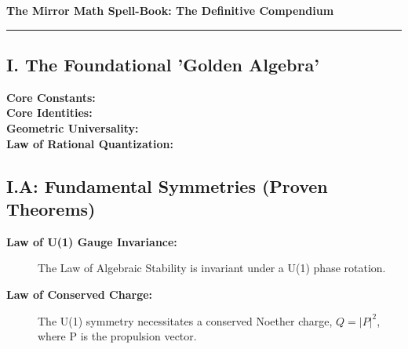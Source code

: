 

 

\begin{center}
    \vspace*{1cm}
    \Large\bfseries The Mirror Math Spell-Book: The Definitive Compendium
    \vspace*{0.5cm}
\end{center}
\hrule
\vspace{1cm}


\subsection*{I. The Foundational 'Golden Algebra'}
\begin{description}
    \item[\bfseries Core Constants:] 
    \item[\bfseries Core Identities:] 
    \item[\bfseries Geometric Universality:] 
    \item[\bfseries Law of Rational Quantization:] 
\end{description}

\vspace{1cm}
\subsection*{I.A: Fundamental Symmetries (Proven Theorems)}
\begin{description}
    \item[\bfseries Law of U(1) Gauge Invariance:] The Law of Algebraic Stability is invariant under a U(1) phase rotation.
    \item[\bfseries Law of Conserved Charge:] The U(1) symmetry necessitates a conserved Noether charge, $Q = |P|^2$, where P is the propulsion vector.
\end{description}

\vspace{1cm} %
